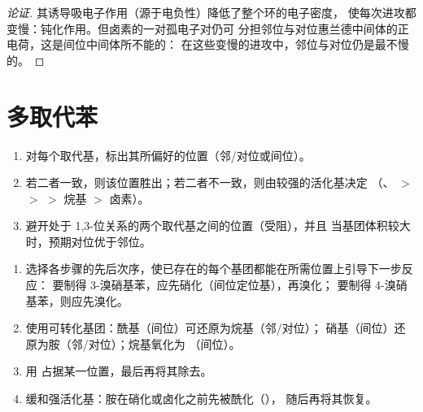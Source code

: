 \begin{proof}[论证]
其诱导吸电子作用（源于电负性）降低了整个环的电子密度，
使每次进攻都变慢：钝化作用。但卤素的一对孤电子对仍可
分担邻位与对位惠兰德中间体的正电荷，这是间位中间体所不能的：
在这些变慢的进攻中，邻位与对位仍是最不慢的。
\end{proof}

\section{多取代苯}

\begin{method}[预测取代位置]\label{met:b2:aromatic-substitution:predict-position}
\begin{enumerate}
  \item 对每个取代基，标出其所偏好的位置（邻/对位或间位）。
  \item 若二者一致，则该位置胜出；若二者不一致，则由较强的活化基决定
        （、 $>$  $>$  $>$ 烷基 $>$ 卤素）。
  \item 避开处于 1,3-位关系的两个取代基之间的位置（受阻），并且
        当基团体积较大时，预期对位优于邻位。
\end{enumerate}
\end{method}

\begin{method}[芳香化合物的合成规划]\label{met:b2:aromatic-substitution:plan-aromatic}
\begin{enumerate}
  \item 选择各步骤的先后次序，使已存在的每个基团都能在所需位置上引导下一步反应：
        要制得 3-溴硝基苯，应先硝化（间位定位基），再溴化；
        要制得 4-溴硝基苯，则应先溴化。
  \item 使用可转化基团：酰基（间位）可还原为烷基（邻/对位）；
        硝基（间位）还原为胺（邻/对位）；烷基氧化为
        （间位）。
  \item 用  占据某一位置，最后再将其除去。
  \item 缓和强活化基：胺在硝化或卤化之前先被酰化（），
        随后再将其恢复。
\end{enumerate}
\end{method}

